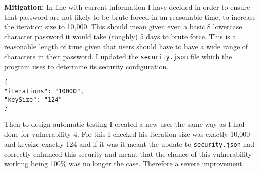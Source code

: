 \textbf{Mitigation:} In line with current information I have decided in order to ensure that password are not likely to be brute forced in an reasonable time, to increase the
iteration size to 10,000\cite{10.1007/978-3-030-11437-4_8}. This should mean given even a basic 8 lowercase character password it would take (roughly) 5 days to brute force. This is a reasonable length of time
given that users should have to have a wide range of characters in their password. I updated the \verb|security.json| file which the program uses to determine its security
configuration.
\begin{verbatim}
{
"iterations": "10000",
"keySize": "124"
}
\end{verbatim}
Then to design automatic testing I created a new user the same way as I had done for vulnerability 4. For this I checked his iteration size was exactly 10,000 and keysize exactly 124 and if it was
it meant the update to \verb|security.json| had correctly enhanced this security and meant that the chance of this vulnerability working being 100\% was no longer the case. Therefore
a severe improvement.
